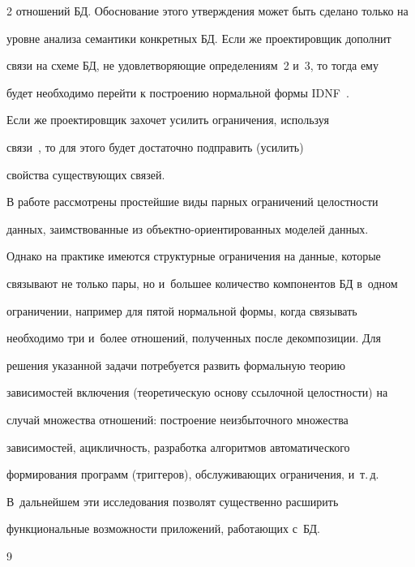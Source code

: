 \begin{multicols}{2}
отношений БД. Обоснование этого утверждения может быть сделано только на

уровне анализа семантики конкретных БД. Если же проектировщик дополнит

связи на схеме БД, не удовлетворяющие определениям~2 и~3, то тогда ему

будет необходимо перейти к построению нормальной формы IDNF~\cite{5-z}.

Если же проектировщик захочет усилить ограничения, используя

  связи~\cite{8-z}, то для этого будет достаточно подправить (усилить)

свойства существующих связей.



  В работе рассмотрены простейшие виды парных ограничений целостности

данных, заимствованные из объектно-ориентированных моделей данных.

Однако на практике имеются структурные ограничения на данные, которые

связывают не только пары, но и~большее количество компонентов БД в~одном

ограничении, например для пятой нормальной формы, когда связывать

необходимо три и~более отношений, полученных после декомпозиции. Для

решения указанной задачи потребуется развить формальную теорию

зависимостей включения (теоретическую основу ссылочной целостности) на

случай множества отношений: построение неизбыточного множества

зависимостей, ацикличность, разработка алгоритмов автоматического

формирования программ (триггеров), обслуживающих ограничения, и~т.\,д.

В~дальнейшем эти исследования позволят существенно расширить

функциональные возможности приложений, работающих с~БД.



{\small\frenchspacing

 {%


 \begin{thebibliography}{9}


\end{thebibliography}}}
\end{multicols}
